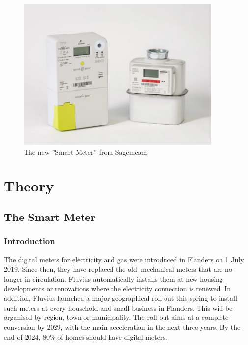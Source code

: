 \documentclass[a4paper,twoside, 12pt]{report}
\theoremstyle{break}
\begin{document}
\begin{figure}[H]
  \centering
  \includegraphics[width=0.9\textwidth]{SmartMeter.jpg}
  \caption{The new ''Smart Meter'' from Sagemcom}
\end{figure}

\eject


\chapter{Theory}

\section{The Smart Meter}

\subsection{Introduction}

The digital meters for electricity and gas were introduced in Flanders on 1 July 2019. Since then, they have replaced the old, mechanical meters that are no longer in circulation. Fluvius automatically installs them at new housing developments or renovations where the electricity connection is renewed. In addition, Fluvius launched a major geographical roll-out this spring to install such meters at every household and small business in Flanders. This will be organised by region, town or municipality. The roll-out aims at a complete conversion by 2029, with the main acceleration in the next three years. By the end of 2024, 80\% of homes should have digital meters.
\end{document}
